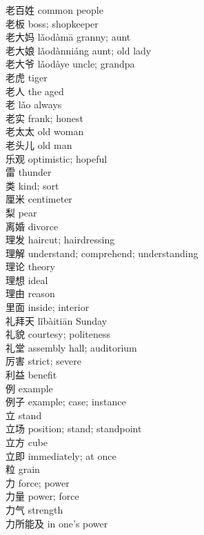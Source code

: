 老百姓 \quad common people\\
老板 \quad boss; shopkeeper\\
老大妈 \quad lǎodàmā \quad granny; aunt\\
老大娘 \quad lǎodànniáng \quad aunt; old lady\\
老大爷 \quad lǎodàye \quad uncle; grandpa\\
老虎 \quad tiger\\
老人 \quad the aged\\
老 \quad lǎo \quad always\\
老实 \quad frank; honest\\
老太太 \quad old woman\\
老头儿 \quad old man\\
乐观 \quad optimistic; hopeful\\
雷 \quad thunder\\
类 \quad kind; sort\\
厘米 \quad centimeter\\
梨 \quad pear\\
离婚 \quad divorce\\
理发 \quad haircut; hairdressing\\
理解 \quad understand; comprehend; understanding\\
理论 \quad theory\\
理想 \quad ideal\\
理由 \quad reason\\
里面 \quad inside; interior\\
礼拜天 \quad lǐbàitiān \quad Sunday\\
礼貌 \quad courtesy; politeness\\
礼堂 \quad assembly hall; auditorium\\
厉害 \quad strict; severe\\
利益 \quad benefit\\
例 \quad example\\
例子 \quad example; case; instance\\
立 \quad stand\\
立场 \quad position; stand; standpoint\\
立方 \quad cube\\
立即 \quad immediately; at once\\
粒 \quad grain\\
力 \quad force; power\\
力量 \quad power; force\\
力气 \quad strength\\
力所能及 \quad in one's power\\
